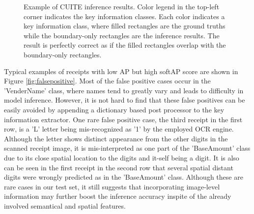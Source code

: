\documentclass[10pt,twocolumn,letterpaper]{article}
\begin{document}
\begin{figure}
\begin{center}
\end{center}
   \caption{Example of CUITE inference results. Color legend in the top-left corner indicates the key information classes. Each color indicates a key information class, where filled rectangles are the ground truths while the boundary-only rectangles are the inference results. The result is perfectly correct as if the filled rectangles overlap with the boundary-only rectangles.}
\label{fig:result}
\end{figure}

Typical examples of receipts with low AP but high softAP score are shown in Figure \ref{fig:falsepositive}. Most of the false positive cases occur in the 'VenderName' class, where names tend to greatly vary and leads to difficulty in model inference. However, it is not hard to find that these false positives can be easily avoided by appending a dictionary based post processor to the key information extractor. One rare false positive case, the third receipt in the first row, is a 'L' letter being mis-recognized as '1' by the employed OCR engine. Although the letter shows distinct appearance from the other digits in the scanned receipt image, it is mis-interpreted as one part of the 'BaseAmount' class due to its close spatial location to the digits and it-self being a digit. It is also can be seen in the first receipt in the second row that several spatial distant digits were wrongly predicted as in the 'BaseAmount' class. Although these are rare cases in our test set, it still suggests that incorporating image-level information may further boost the inference accuracy inspite of the already involved semantical and spatial features. 
\end{document}
